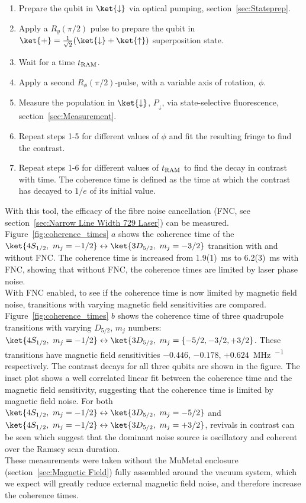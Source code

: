     \begin{enumerate}
        \item Prepare the qubit in $\ket{\downarrow}$ via optical pumping, section~\ref{sec:Stateprep}.
        \item Apply a $R_y(\pi/2)$ pulse to prepare the qubit in $\ket{+} = \frac{1}{\sqrt{2}}(\ket{\downarrow} + \ket{\uparrow})$ superposition state.
        \item Wait for a time $t_{\rm RAM}$.
        \item Apply a second $R_\phi(\pi/2)$-pulse, with a variable axis of rotation, $\phi$. 
        \item Measure the population in $\ket{\downarrow}$, $P_\downarrow$, via state-selective fluorescence, section~\ref{sec:Measurement}.
        \item Repeat steps 1-5 for different values of $\phi$ and fit the resulting fringe to find the contrast.
        \item Repeat steps 1-6 for different values of $t_{\rm RAM}$ to find the decay in contrast with time. The coherence time is defined as the time at which the contrast has decayed to $1/e$ of its initial value.
    \end{enumerate}
    With this tool, the efficacy of the fibre noise cancellation (FNC, see section~\ref{sec:Narrow Line Width 729 Laser}) can be measured. Figure~\ref{fig:coherence_times} $a$ shows the coherence time of the $\ket{4S_{1/2},~m_j=-1/2}\leftrightarrow\ket{3D_{5/2},~m_j=-3/2}$  transition with and without FNC. The coherence time is increased from 1.9(1)~\unit{\ms} to 6.2(3)~\unit{\ms} with FNC, showing that without FNC, the coherence times are limited by laser phase noise. \\
    With FNC enabled, to see if the coherence time is now limited by magnetic field noise, transitions with varying magnetic field sensitivities are compared. Figure~\ref{fig:coherence_times} $b$ shows the coherence time of three quadrupole transitions with varying $D_{5/2}$, $m_j$ numbers: $\ket{4S_{1/2},~m_j=-1/2} \leftrightarrow \ket{3D_{5/2},~m_j=\lbrace -5/2, -3/2, +3/2}$. These transitions have magnetic field sensitivities $-0.446$, $-0.178$, $+0.624$~\unit{\MHz\per\gauss} respectively. The contrast decays for all three qubits are shown in the figure. The inset plot shows a well correlated linear fit between the coherence time and the magnetic field sensitivity, suggesting that the coherence time is limited by magnetic field noise. For both $\ket{4S_{1/2},~m_j=-1/2} \leftrightarrow \ket{3D_{5/2},~m_j=-5/2}$ and $\ket{4S_{1/2},~m_j=-1/2} \leftrightarrow \ket{3D_{5/2},~m_j=+3/2}$, revivals in contrast can be seen which suggest that the dominant noise source is oscillatory and coherent over the Ramsey scan duration.\\
    These measurements were taken without the MuMetal enclosure (section~\ref{sec:Magnetic Field}) fully assembled around the vacuum system, which we expect will greatly reduce external magnetic field noise, and therefore increase the coherence times.


